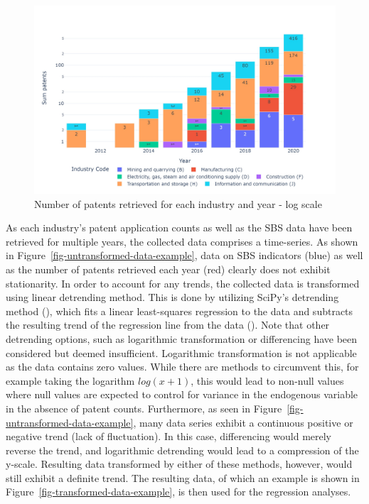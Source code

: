 \documentclass[
  12pt,
  a4paperpaper,
]{article}
\begin{document}
\begin{figure}[H]

{\centering \includegraphics{rieg2023_files/figure-pdf/fig-sum-patents-retrieved-output-1.jpeg}

}

\caption{\label{fig-sum-patents-retrieved}Number of patents retrieved
for each industry and year - log scale}

\end{figure}

As each industry's patent application counts as well as the SBS data
have been retrieved for multiple years, the collected data comprises a
time-series. As shown in Figure~\ref{fig-untransformed-data-example},
data on SBS indicators (blue) as well as the number of patents retrieved
each year (red) clearly does not exhibit stationarity. In order to
account for any trends, the collected data is transformed using linear
detrending method. This is done by utilizing SciPy's detrending method
(), which fits
a linear least-squares regression to the data and subtracts the
resulting trend of the regression line from the data
(). Note that other detrending options, such as
logarithmic transformation or differencing have been considered but
deemed insufficient. Logarithmic transformation is not applicable as the
data contains zero values. While there are methods to circumvent this,
for example taking the logarithm \(log(x+1)\), this would lead to
non-null values where null values are expected to control for variance
in the endogenous variable in the absence of patent counts. Furthermore,
as seen in Figure~\ref{fig-untransformed-data-example}, many data series
exhibit a continuous positive or negative trend (lack of fluctuation).
In this case, differencing would merely reverse the trend, and
logarithmic detrending would lead to a compression of the y-scale.
Resulting data transformed by either of these methods, however, would
still exhibit a definite trend. The resulting data, of which an example
is shown in Figure~\ref{fig-transformed-data-example}, is then used for
the regression analyses.
\end{document}
